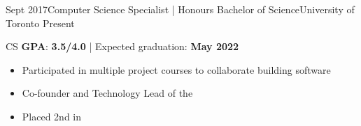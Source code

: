 %
%
%


\begin{experiences}
  \university
    {Sept 2017}{Computer Science Specialist | Honours Bachelor of Science}{University of Toronto}
    {Present} {
                      CS \textbf{GPA}: \textbf{3.5/4.0} | Expected graduation: \textbf{May 2022}
                      \begin{itemize}
                        \item Participated in multiple project courses to collaborate building software 
                        \item Co-founder and Technology Lead of the            
                        \item Placed 2nd in                                                                 
                      \end{itemize}
                    }
\end{experiences}

